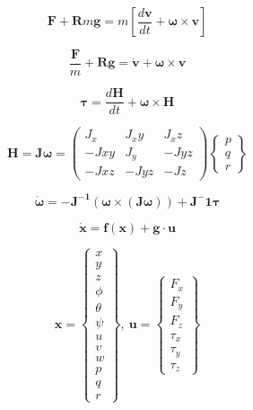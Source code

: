 \begin{equation}\label{eq:SistemaQuadrirotore_Forze}
	\mathbf{F} + \mathbf{R} m \mathbf{g} = m \left[\frac{d \mathbf{v}}{d t} + \boldsymbol{\omega}\times \mathbf{v}\right]
\end{equation}

\begin{equation}\label{eq:SistemaQuadrirotore_acc}
	\frac{\mathbf{F}}{m} + \mathbf{R} \mathbf{g} = \mathbf{\dot{v}} + \boldsymbol{\omega} \times \mathbf{v}
\end{equation}

\begin{equation}\label{eq:SistemaQuadrirotore_momenti}
	\boldsymbol{\tau} = \frac{d \mathbf{H}}{d t } + \boldsymbol{\omega} \times \mathbf{H}
\end{equation}

\begin{equation}
	\mathbf{H} = \mathbf{J} \boldsymbol{\omega} =
	\begin{pmatrix}
		J_x & J_xy & J_xz \\
		-Jxy & J_y & -Jyz \\
		-Jxz & -Jyz & -Jz 
	\end{pmatrix}
	\begin{Bmatrix}
		p\\
		q\\
		r
	\end{Bmatrix}
\end{equation}

\begin{equation}\label{eq:SistemaQuadrirotore_accang}
	\boldsymbol{\dot{\omega}} = - \mathbf{J^{-1}}\left(\boldsymbol{\omega}\times\left(\mathbf{J}\boldsymbol{\omega}\right)\right) + \mathbf{J^-1}\boldsymbol{\tau}
\end{equation}

\begin{equation}\label{eq:SistemaQuadrirotore_statespace}
	\mathbf{\dot{x}} = \mathbf{f(x)} + \mathbf{g} \cdot \mathbf{u}
\end{equation}

\[ 
	\mathbf{x} = \begin{Bmatrix}
		x \\ y \\ z \\ \phi \\ \theta \\ \psi \\ u \\ v \\ w \\ p \\ q \\ r
	\end{Bmatrix}, \  \mathbf{u} = \begin{Bmatrix}
	F_x \\ F_y \\ F_z \\ \tau_x \\ \tau_y \\ \tau_z
	\end{Bmatrix}
\]

